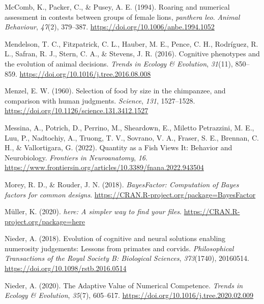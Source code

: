 \documentclass[
  ,pub,floatsintext]{apa6}
\newlength{\cslhangindent}
\newlength{\cslentryspacingunit} %
\newenvironment{CSLReferences}[2] %
 {%
  \setlength{\parindent}{0pt}
  \ifodd #1
  \let\oldpar\par
  \def\par{\hangindent=\cslhangindent\oldpar}
  \fi
  \setlength{\parskip}{#2\cslentryspacingunit}
 }%
 {}
\begin{document}
\begin{CSLReferences}{1}{0}
\leavevmode{}%
McComb, K., Packer, C., \& Pusey, A. E. (1994). Roaring and numerical assessment in contests between groups of female lions, \emph{panthera leo}. \emph{Animal Behaviour}, \emph{47}(2), 379--387. \url{https://doi.org/10.1006/anbe.1994.1052}

\leavevmode{}%
Mendelson, T. C., Fitzpatrick, C. L., Hauber, M. E., Pence, C. H., Rodríguez, R. L., Safran, R. J., Stern, C. A., \& Stevens, J. R. (2016). Cognitive phenotypes and the evolution of animal decisions. \emph{Trends in Ecology \& Evolution}, \emph{31}(11), 850--859. \url{https://doi.org/10.1016/j.tree.2016.08.008}

\leavevmode{}%
Menzel, E. W. (1960). Selection of food by size in the chimpanzee, and comparison with human judgments. \emph{Science}, \emph{131}, 1527--1528. \url{https://doi.org/10.1126/science.131.3412.1527}

\leavevmode{}%
Messina, A., Potrich, D., Perrino, M., Sheardown, E., Miletto Petrazzini, M. E., Luu, P., Nadtochiy, A., Truong, T. V., Sovrano, V. A., Fraser, S. E., Brennan, C. H., \& Vallortigara, G. (2022). Quantity as a {Fish Views It}: {Behavior} and {Neurobiology}. \emph{Frontiers in Neuroanatomy}, \emph{16}. \url{https://www.frontiersin.org/articles/10.3389/fnana.2022.943504}

\leavevmode{}%
Morey, R. D., \& Rouder, J. N. (2018). \emph{BayesFactor: Computation of {Bayes} factors for common designs}. \url{https://CRAN.R-project.org/package=BayesFactor}

\leavevmode{}%
Müller, K. (2020). \emph{{here}: A simpler way to find your files}. \url{https://CRAN.R-project.org/package=here}

\leavevmode{}%
Nieder, A. (2018). Evolution of cognitive and neural solutions enabling numerosity judgements: Lessons from primates and corvids. \emph{Philosophical Transactions of the Royal Society B: Biological Sciences}, \emph{373}(1740), 20160514. \url{https://doi.org/10.1098/rstb.2016.0514}

\leavevmode{}%
Nieder, A. (2020). The {Adaptive Value} of {Numerical Competence}. \emph{Trends in Ecology \& Evolution}, \emph{35}(7), 605--617. \url{https://doi.org/10.1016/j.tree.2020.02.009}


\end{CSLReferences}
\end{document}
